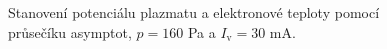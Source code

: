 \documentclass[a4paper,12pt]{article}
\begin{document}
\begin{figure}[h]
	\centering
	\begin{subfigure}[b]{.49\textwidth}
		\centering
	\end{subfigure}
	\begin{subfigure}[b]{.49\textwidth}
		\centering
	\end{subfigure}
	\caption{Stanovení potenciálu plazmatu a elektronové teploty pomocí 
	průsečíku asymptot, $p = 160$ \si{\pascal} a $I_\text{v} = 30$ 
	\si{\milli\ampere}.}
	\label{data1}
\end{figure}
\end{document}
